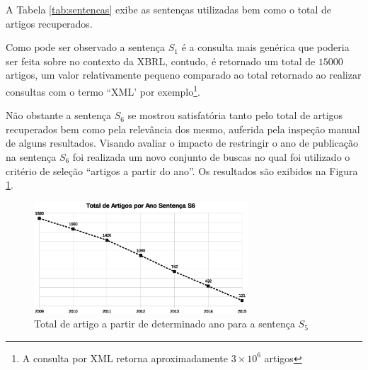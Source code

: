 \documentclass{article}
\begin{document}
A Tabela \ref{tab:sentencas} exibe as sentenças utilizadas bem como o total de artigos recuperados.
\begin{table}[htb]
\centering
{}
\caption{Total de artigos por sentença}
\label{tab:sentencas}
\end{table}

Como pode ser observado a sentença $S_1$ é a consulta mais genérica
que poderia ser feita sobre no contexto da XBRL, contudo, é retornado
um total de $15000$ artigos, um valor relativamente pequeno comparado ao total retornado ao realizar consultas com o termo ``XML' por exemplo\footnote{A consulta por XML retorna aproximadamente $3 \times 10^{6}$ artigos}.

Não obstante a sentença $S_6$ se mostrou satisfatória tanto pelo total
de artigos recuperados bem como pela relevância dos mesmo, auferida
pela inspeção manual de alguns resultados. Visando avaliar o impacto
de restringir o ano de publicação na sentença $S_6$ foi realizada um
novo conjunto de buscas no qual foi utilizado o critério de seleção
``artigos a partir do ano''.  Os resultados são exibidos na Figura \ref{fig:graph_artigos_ano}{}.

\begin{figure}[h]
\label{fig:graph_artigos_ano}
\includegraphics[width=8cm]{../img/graph_01.eps}
\caption{Total de artigo a partir de determinado ano para a sentença $S_5$}
\centering
\end{figure}
\end{document}
